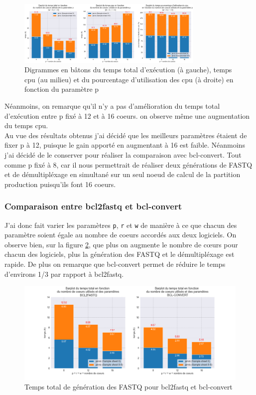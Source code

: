 \begin{figure}[H]
    \centering
    \includegraphics[width=0.8\textwidth]{img/barplot_cum_jarvis1.png}
    \caption{\footnotesize{Digrammes en bâtons du temps total d'exécution (à gauche), temps cpu (au milieu) et du pourcentage d'utilisation des cpu (à droite) en fonction du paramètre p}}
    \label{barplot-param2}
\end{figure}

Néanmoins, on remarque qu'il n'y a pas d'amélioration du temps total d'exécution entre p fixé à 12 et à 16 coeurs. on observe même une augmentation du temps cpu.\\

Au vue des résultats obtenus j'ai décidé que les meilleurs paramètres étaient de fixer p à 12, puisque le gain apporté en augmentant à 16 est faible. Néanmoins j'ai décidé de le conserver pour réaliser la comparaison avec bcl-convert.
Tout comme p fixé à 8, car il nous permettrait de réaliser deux générations de FASTQ et de démultipléxage en simultané sur un seul noeud de calcul de la partition \og production\fg{} puisqu'ils font 16 coeurs.\\

\subsubsection*{Comparaison entre bcl2fastq et bcl-convert}
J'ai donc fait varier les paramètres \texttt{p}, \texttt{r} et \texttt{w} de manière à ce que chacun des paramètre soient égale au nombre de coeurs accordés aux deux logiciels. On observe bien, sur la figure \ref{fig-total-time}, que plus on augmente le nombre de cœurs pour chacun des logiciels, plus la génération des FASTQ et le démultipléxage est rapide. De plus on remarque que bcl-convert permet de réduire le temps d'environs 1/3 par rapport à bcl2fastq. 

\begin{figure}[H]
    \centering
    \includegraphics[width=1\textwidth]{img/barplot_total_time_comp.png}
    \caption{\footnotesize{Temps total de génération des FASTQ pour bcl2fastq et bcl-convert}}
    \label{fig-total-time}
\end{figure}

